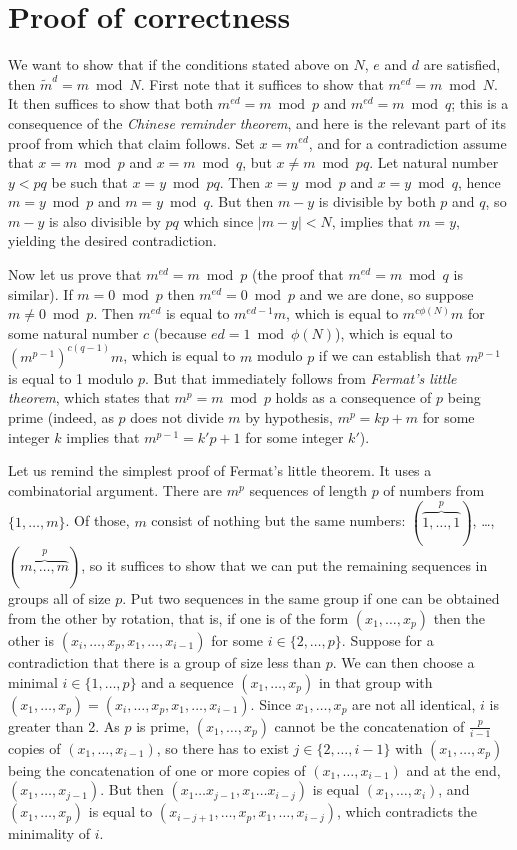\documentclass{amsart}
\begin{document}
\section{Proof of correctness}

We want to show that if the conditions stated above on $N$, $e$ and $d$ are satisfied, then $\widetilde{m}^d =m\bmod N$. First note that it suffices to show that $m^{ed}=m \bmod N$. It then suffices to show that both $m^{ed}=m\bmod p$ and $m^{ed}=m\bmod q$; this is a consequence of the \emph{Chinese reminder theorem}, and here is the relevant part of its proof from which that claim follows. Set $x=m^{ed}$, and for a contradiction assume that $x=m\bmod p$ and $x=m\bmod q$, but $x\neq m\bmod pq$. Let natural number $y<pq$ be such that $x=y\bmod pq$. Then $x=y\bmod p$ and $x=y\bmod q$, hence $m=y\bmod p$ and $m=y\bmod q$. But then $m-y$ is divisible by both $p$ and $q$, so $m-y$ is also divisible by $pq$ which since $|m-y|<N$, implies that $m=y$, yielding the desired contradiction.

Now let us prove that $m^{ed}=m\bmod p$ (the proof that $m^{ed}=m\bmod q$ is similar). If $m=0\bmod p$ then $m^{ed}=0\bmod p$ and we are done, so suppose $m\neq 0\bmod p$. Then $m^{ed}$ is equal to $m^{ed-1}m$, which is equal to $m^{c\phi(N)}m$ for some natural number $c$ (because $ed = 1\bmod\phi(N)$), which is equal to $(m^{p-1})^{c(q-1)}m$, which is equal to $m$ modulo $p$ if we can establish that $m^{p-1}$ is equal to 1 modulo $p$. But that immediately follows from \emph{Fermat's little theorem}, which states that $m^p=m\bmod p$ holds as a consequence of $p$ being prime (indeed, as $p$ does not divide $m$ by hypothesis, $m^p = kp + m$ for some integer $k$ implies that $m^{p-1} = k'p+1$ for some integer $k'$).

Let us remind the simplest proof of Fermat's little theorem. It uses a combinatorial argument. There are $m^p$ sequences of length $p$ of numbers from $\{1,\dots,m\}$. Of those, $m$ consist of nothing but the same numbers: $(\overbrace{1,\dots, 1}^p)$, \dots, $(\overbrace{m,\dots, m}^p)$, so it suffices to show that we can put the remaining sequences in groups all of size $p$. Put two sequences in the same group if one can be obtained from the other by rotation, that is, if one is of the form $(x_1,\dots,x_p)$ then the other is $(x_i,\dots,x_p,x_1,\dots,x_{i-1})$ for some $i\in\{2,\dots,p\}$. Suppose for a contradiction that there is a group of size less than $p$. We can then choose a minimal $i\in\{1,\dots,p\}$ and a sequence $(x_1,\dots,x_p)$ in that group with $(x_1,\dots,x_p)=(x_i,\dots,x_p,x_1,\dots,x_{i-1})$. Since $x_1,\dots,x_p$ are not all identical, $i$ is greater than 2. As $p$ is prime, $(x_1,\dots,x_p)$ cannot be the concatenation of $\frac{p}{i-1}$ copies of $(x_1,\dots,x_{i-1})$, so there has to exist $j\in\{2,\dots, i-1\}$ with $(x_1,\dots,x_p)$ being the concatenation of one or more copies of $(x_1,\dots,x_{i-1})$ and at the end, $(x_1,\dots,x_{j-1})$.
But then $(x_1\dots x_{j-1},x_1\dots x_{i-j})$ is equal $(x_1,\dots,x_i)$, and $(x_1,\dots,x_p)$ is equal to $(x_{i-j+1},\dots, x_p,x_1,\dots, x_{i-j})$, which contradicts the minimality of $i$.
\end{document}

